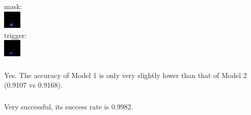 \documentclass{article}
\begin{document}
\subsection{}
\subsubsection{}
mask: \\
\includegraphics[scale=2]{backdoor-mask.jpg} \\
trigger: \\
\includegraphics[scale=2]{backdoor-trigger.jpg}
\subsubsection{}
Yes. The accuracy of Model 1 is only very slightly lower than that of Model 2 (0.9107 vs 0.9168).
\subsubsection{}
Very successful, its success rate is 0.9982.
\end{document}
